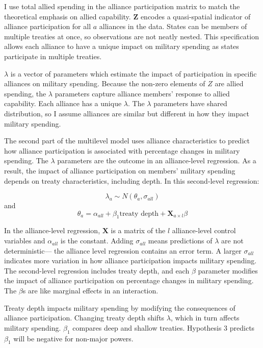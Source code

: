 \documentclass[12pt]{article}
\begin{document}
I use total allied spending in the alliance participation matrix to match the theoretical emphasis on allied capability. 
$\textbf{Z}$ encodes a quasi-spatial indicator of alliance participation for all $a$ alliances in the data. 
States can be members of multiple treaties at once, so observations are not neatly nested. 
This specification allows each alliance to have a unique impact on military spending as states participate in multiple treaties. 


$\lambda$ is a vector of parameters which estimate the impact of participation in specific alliances on military spending. 
Because the non-zero elements of $Z$ are allied spending, the $\lambda$ parameters capture alliance members' response to allied capability. 
Each alliance has a unique $\lambda$. 
The $\lambda$ parameters have shared distribution, so I assume alliances are similar but different in how they impact military spending. 


The second part of the multilevel model uses alliance characteristics to predict how alliance participation is associated with percentage changes in military spending. 
The $\lambda$ parameters are the outcome in an alliance-level regression.
As a result, the impact of alliance participation on members' military spending depends on treaty characteristics, including depth. 
In this second-level regression: 


\begin{equation}
\lambda_{a} \sim N(\theta_{a}, \sigma_{all})
\end{equation} 
and 
\begin{equation}
\theta_{a} = \alpha_{all} + \beta_1 \mbox{treaty depth} + \textbf{X}_{a \times l} \beta
\end{equation}


In the alliance-level regression, $\textbf{X}$ is a matrix of the $l$ alliance-level control variables and $\alpha_{all}$ is the constant.
Adding $\sigma_{all}$ means predictions of $\lambda$ are not deterministic--- the alliance level regression contains an error term. 
A larger $\sigma_{all}$ indicates more variation in how alliance participation impacts military spending. 
The second-level regression includes treaty depth, and each $\beta$ parameter modifies the impact of alliance participation on percentage changes in military spending. 
The $\beta$s are like marginal effects in an interaction. 


Treaty depth impacts military spending by modifying the consequences of alliance participation. 
Changing treaty depth shifts $\lambda$, which in turn affects military spending.
$\beta_1$ compares deep and shallow treaties. 
Hypothesis 3 predicts $\beta_1$ will be negative for non-major powers. 
\end{document}
